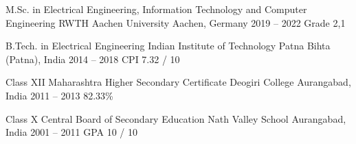 
\begin{cveducation}

\cvschool
	{M.Sc. in Electrical Engineering, Information Technology and Computer Engineering} %
	{RWTH Aachen University} %
	{Aachen, Germany} %
	{2019 -- 2022} %
	{Grade 2,1} %

\cvschool
	{B.Tech. in Electrical Engineering} %
	{Indian Institute of Technology Patna} %
	{Bihta (Patna), India} %
	{2014 -- 2018} %
	{CPI 7.32 / 10} %

\cvschool
	{Class XII Maharashtra Higher Secondary Certificate} %
	{Deogiri College} %
	{Aurangabad, India} %
	{2011 -- 2013} %
	{82.33\%} %

\cvschool
	{Class X Central Board of Secondary Education} %
	{Nath Valley School} %
	{Aurangabad, India} %
	{2001 -- 2011} %
	{GPA 10 / 10} %

\end{cveducation}
